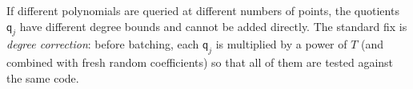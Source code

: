 \documentclass[../../book]{subfiles}
\begin{document}
\begin{remark}
    If different polynomials are queried at different numbers of points, the quotients $\mathsf{q}_j$ have different degree bounds and cannot be added directly.
    The standard fix is \emph{degree correction}: before batching, each $\mathsf{q}_j$ is multiplied by a power of $T$ (and combined with fresh random coefficients) so that all of them are tested against the same code.
\end{remark}
\end{document}
